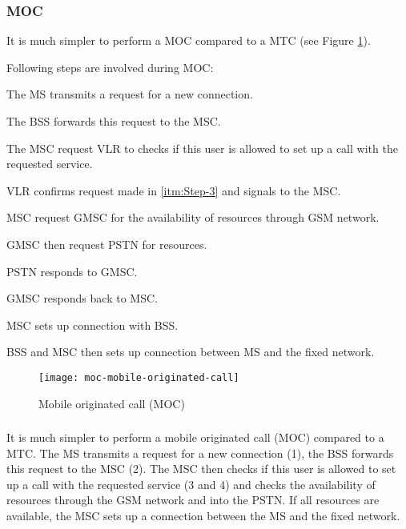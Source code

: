 \subsubsection{MOC}
It is much simpler to perform a MOC compared to a MTC (see Figure \ref{fig:moc-mobile-originated-call}). 

Following steps are involved during MOC:

\begin{steps}
	\item The MS transmits a request for a new connection.
	\item The BSS forwards this request to the MSC.
	\item The MSC request VLR to checks if this user is allowed to set up a call with the requested service.\label{itm:Step-3}
	\item VLR confirms request made in \ref{itm:Step-3} and signals to the MSC.
	\item MSC request GMSC for the availability of resources through GSM network.
	\item GMSC then request PSTN for resources.
	\item PSTN responds to GMSC.
	\item GMSC responds back to MSC.
	\item MSC sets up connection with BSS.
	\item BSS and MSC then sets up connection between MS and the fixed network. 
\end{steps}

\begin{figure}[ht!]
	\centering
	\texttt{[image: moc-mobile-originated-call]}
	\caption{Mobile originated call (MOC)}\label{fig:moc-mobile-originated-call}
\end{figure}

\begin{framed}
\subsubsection*{}
It is much simpler to perform a mobile originated call (MOC) compared to a MTC. The MS transmits a request for a new connection (1), the BSS forwards this request to the MSC (2). The MSC then checks if this user is allowed to set up a call with the requested service (3 and 4) and checks the availability of resources through the GSM network and into the PSTN. If all resources are available, the MSC sets up a connection between the MS and the fixed network.
\end{framed}

